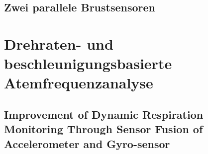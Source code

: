 	\subsection*{Zwei parallele Brustsensoren}
	
	
	
\section{Drehraten- und beschleunigungsbasierte Atemfrequenzanalyse}

	\subsection*{Improvement of Dynamic Respiration Monitoring Through Sensor Fusion of Accelerometer and Gyro-sensor}

